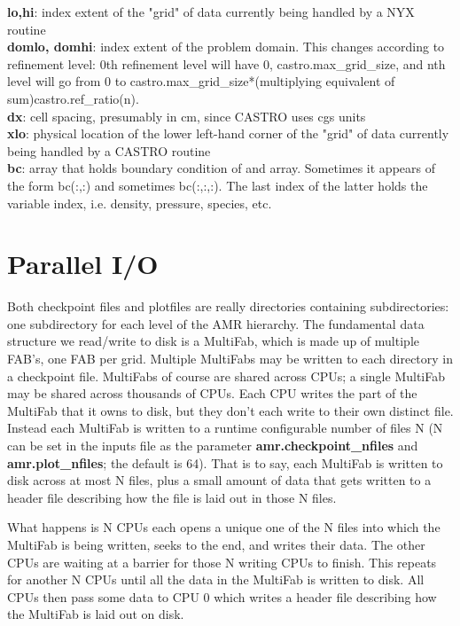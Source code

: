 {\bf lo,hi}: index extent of the "grid" of data currently being handled by a NYX routine\\

{\bf domlo, domhi}: index extent of the problem domain. This changes according to refinement level: 0th refinement level will have 0, castro.max\_grid\_size, and nth level will go from 0 to castro.max\_grid\_size*(multiplying equivalent of sum)castro.ref\_ratio(n).\\

{\bf dx}: cell spacing, presumably in cm, since CASTRO uses cgs units\\

{\bf xlo}: physical location of the lower left-hand corner of the "grid" of data currently being handled by a CASTRO routine\\

{\bf bc}: array that holds boundary condition of and array. Sometimes it appears of the form bc(:,:) and sometimes bc(:,:,:). The last index of the latter holds the variable index, i.e. density, pressure, species, etc.\\

\section{Parallel I/O}
Both checkpoint files and plotfiles are really directories containing subdirectories: 
one subdirectory for each level of the AMR hierarchy.  The fundamental data structure 
we read/write to disk is a MultiFab, which is made up of multiple FAB's, one FAB per grid.
Multiple MultiFabs may be written to each directory in a checkpoint file.  
MultiFabs of course are shared across CPUs; a single MultiFab may be 
shared across thousands of CPUs.  Each CPU writes the part of the MultiFab that it owns to disk, 
but they don't each write to their own distinct file.  Instead each MultiFab is written to a 
runtime configurable number of files N (N can be set in the inputs file as the
parameter {\bf amr.checkpoint\_nfiles} and {\bf amr.plot\_nfiles}; the default is 64).  
That is to say, each MultiFab is written to disk across at most N files, 
plus a small amount of data that gets written to a header file describing how the 
file is laid out in those N files.

What happens is N CPUs each opens a unique one of the N files into which the MultiFab is 
being written, seeks to the end, and writes their data.  The other CPUs are waiting at a 
barrier for those N writing CPUs to finish.  This repeats for another N CPUs until all the 
data in the MultiFab is written to disk.  All CPUs then pass some data to CPU 0 which writes 
a header file describing how the MultiFab is laid out on disk.

